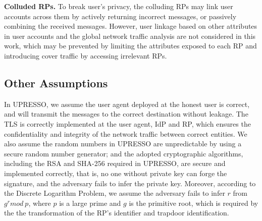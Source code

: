 \vspace{1mm}\noindent \textbf{Colluded RPs.} To break user's privacy, the colluding RPs may link user accounts across them by actively returning incorrect messages, or passively combining the received messages.
However, user linkage based on other attributes in user accounts and the global network traffic analysis are not considered in this work, which may be prevented by limiting the attributes exposed to each RP and introducing cover traffic by accessing irrelevant RPs.

\subsection{Other Assumptions}
In UPRESSO, we assume the user agent deployed at the honest user is correct,
and will transmit the messages to the correct destination without leakage.
The TLS is correctly implemented at the user agent, IdP and RP, which ensures the confidentiality and integrity of the network traffic between correct entities.
We also assume the random numbers in UPRESSO are unpredictable by using  a secure random number generator;
and the adopted cryptographic algorithms, including the RSA and SHA-256 required in UPRESSO, are secure and implemented correctly, that is, no one without private key can forge the signature,
and the adversary fails to infer the private key.
Moreover, according to the Discrete Logarithm Problem,
we assume the adversary fails to infer $r$ from $g^r mod\ p$, where $p$ is a large prime and $g$ is the primitive root, which is required by the the transformation of the RP's identifier and trapdoor identification.

\begin{comment}
\subsection{Assumptions}
In UPRESSO, we assume the user agent deployed at the honest user is correct,
and will transmit the messages to the correct destination without leakage.
The TLS is correctly implemented at the user agent, IdP and RP, which ensures the confidentiality and integrity of the network traffic between correct entities.
We also assume the nonce is unpredictable by using  a secure random number generator;
and the adopted cryptographic algorithms, including the RSA and SHA-256 for the RP certificate, are secure and implemented correctly, that is, no one without the IdP's private key can produce a valid certificate,
and the adversary fails to infer the private key.
Moreover, the transformation of the RP's identifier and the user's account calculation are based on the Discrete Logarithm Problem,
we assume the adversary fails to infer $r$ from $g^r mod\ p$, where $p$ is a large prime and $g$ is the primitive root.
\end{comment}







